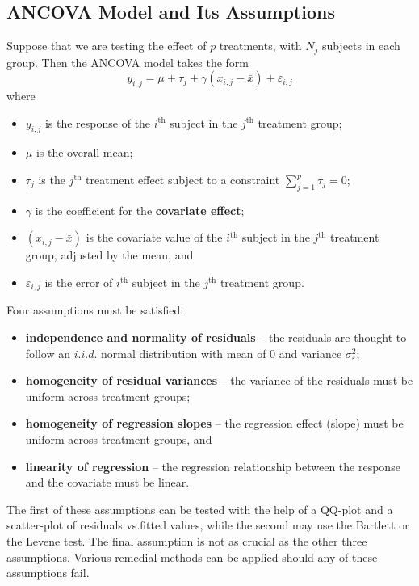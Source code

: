 \subsection{ANCOVA Model and Its Assumptions}
Suppose that we are testing the effect of $p$ treatments, with $N_{j}$ subjects in each group. Then the ANCOVA model takes the form
\begin{equation}\label{eq:ANCOVA}
    y_{i,j}=\mu+\tau_{j}+\gamma (x_{i,j}-\bar{x})+\varepsilon_{i,j}
\end{equation}
where 
\begin{itemize}[noitemsep]
    \item $y_{i,j}$ is the response of the $i^{\text{th}}$ subject in the $j^{\text{th}}$ treatment group;
    \item $\mu$ is the overall mean;
    \item $\tau_{j}$ is the $j^{\text{th}}$ treatment effect subject to a constraint $\sum_{j=1}^{p}\tau_{j}=0$;
    \item $\gamma$ is the coefficient for the \textbf{covariate effect};
    \item $(x_{i,j}-\bar{x})$ is the covariate value of the $i^{\text{th}}$ subject in the $j^{\text{th}}$ treatment group, adjusted by the mean, and
    \item $\varepsilon_{i,j}$ is the error of $i^{\text{th}}$ subject in the $j^{\text{th}}$ treatment group.
\end{itemize}
Four assumptions must be satisfied:
\begin{itemize}[noitemsep]
    \item \textbf{independence and normality of residuals} -- the residuals are thought to follow an ${i.i.d.}$ normal distribution with mean of $0$ and variance $\sigma^{2}_{\varepsilon}$;
    \item \textbf{homogeneity of residual variances} -- the variance of the residuals must be uniform across treatment groups;
    \item \textbf{homogeneity of regression slopes} -- the regression effect (slope) must be uniform across treatment groups, and
    \item \textbf{linearity of regression} -- the regression relationship between the response and the covariate must be linear.
\end{itemize}
The first of these assumptions can be tested with the help of a QQ-plot and a scatter-plot of residuals vs.\@ fitted values, while the second may use the Bartlett or the Levene test. The final assumption is not as crucial as the other three assumptions. Various remedial methods can be applied should any of these assumptions fail.  

